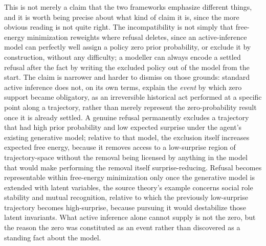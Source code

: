 \documentclass[11pt]{article}
\theoremstyle{plain}
\begin{document}
This is not merely a claim that the two frameworks emphasize different things, and it is worth being precise about what kind of claim it is, since the more obvious reading is not quite right. The incompatibility is not simply that free-energy minimization reweights where refusal deletes, since an active-inference model can perfectly well assign a policy zero prior probability, or exclude it by construction, without any difficulty; a modeller can always encode a settled refusal after the fact by writing the excluded policy out of the model from the start. The claim is narrower and harder to dismiss on those grounds: standard active inference does not, on its own terms, explain the \emph{event} by which zero support became obligatory, as an irreversible historical act performed at a specific point along a trajectory, rather than merely represent the zero-probability result once it is already settled. A genuine refusal permanently excludes a trajectory that had high prior probability and low expected surprise under the agent's existing generative model; relative to that model, the exclusion itself increases expected free energy, because it removes access to a low-surprise region of trajectory-space without the removal being licensed by anything in the model that would make performing the removal itself surprise-reducing. Refusal becomes representable within free-energy minimization only once the generative model is extended with latent variables, the source theory's example concerns social role stability and mutual recognition, relative to which the previously low-surprise trajectory becomes high-surprise, because pursuing it would destabilize those latent invariants. What active inference alone cannot supply is not the zero, but the reason the zero was constituted as an event rather than discovered as a standing fact about the model.
\end{document}
